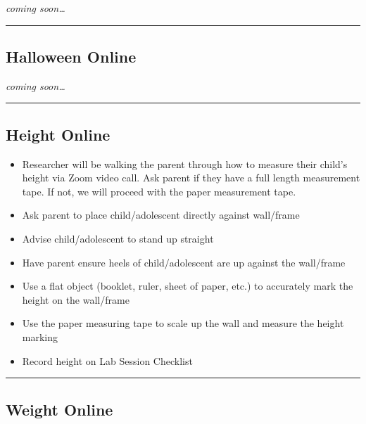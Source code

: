 \documentclass[]{book}
\providecommand{\tightlist}{%
  \setlength{\itemsep}{0pt}\setlength{\parskip}{0pt}}
\begin{document}
\emph{coming soon\ldots{}}

\begin{center}\rule{0.5\linewidth}{0.5pt}\end{center}

\hypertarget{halloween-online}{%
\subsection{Halloween Online}\label{halloween-online}}

\emph{coming soon\ldots{}}

\begin{center}\rule{0.5\linewidth}{0.5pt}\end{center}

\hypertarget{height-online}{%
\subsection{Height Online}\label{height-online}}

\begin{itemize}
\tightlist
\item
  Researcher will be walking the parent through how to measure their child's height via Zoom video call. Ask parent if they have a full length measurement tape. If not, we will proceed with the paper measurement tape.
\item
  Ask parent to place child/adolescent directly against wall/frame
\item
  Advise child/adolescent to stand up straight
\item
  Have parent ensure heels of child/adolescent are up against the wall/frame
\item
  Use a flat object (booklet, ruler, sheet of paper, etc.) to accurately mark the height on the wall/frame
\item
  Use the paper measuring tape to scale up the wall and measure the height marking
\item
  Record height on Lab Session Checklist
\end{itemize}

\begin{center}\rule{0.5\linewidth}{0.5pt}\end{center}

\hypertarget{weight-online}{%
\subsection{Weight Online}\label{weight-online}}
\end{document}
